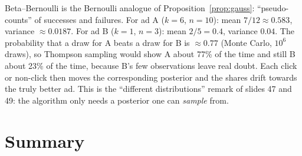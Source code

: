 \documentclass[11pt,a4paper]{article}
\theoremstyle{plain}
\theoremstyle{definition}
\theoremstyle{remark}
\begin{document}
\begin{intuition}
Beta--Bernoulli is the Bernoulli analogue of Proposition~\ref{prop:gauss}: ``pseudo-counts'' of successes and failures. For ad A ($k=6$, $n=10$): mean $7/12\approx0.583$, variance $\approx0.0187$. For ad B ($k=1$, $n=3$): mean $2/5=0.4$, variance $0.04$.
The probability that a draw for A beats a draw for B is $\approx0.77$ (Monte Carlo, $10^6$ draws), so Thompson sampling would show A about 77\% of the time and still B about 23\% of the time, because B's few observations leave
real doubt. Each click or non-click then moves the corresponding posterior and the shares drift towards the truly better ad. This is the ``different distributions'' remark of slides 47 and 49: the algorithm only needs a posterior one can \emph{sample} from.
\end{intuition}

\section{Summary}
\end{document}
